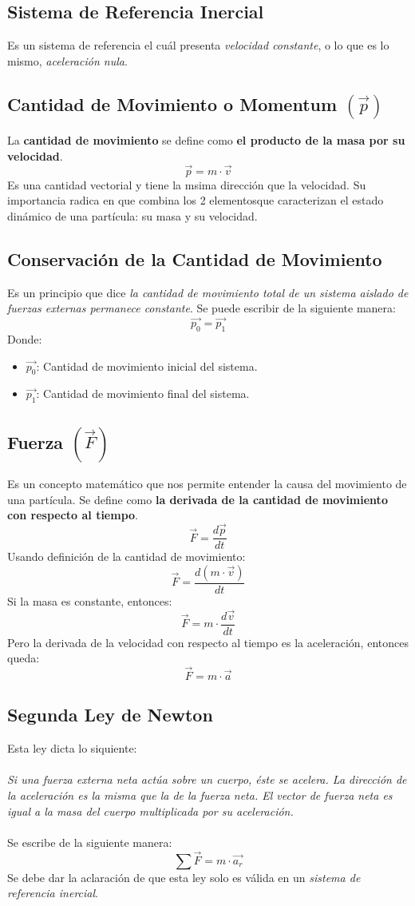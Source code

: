 \documentclass[../main.tex]{subfiles}
\begin{document}
\subsection{Sistema de Referencia Inercial}
Es un sistema de referencia el cuál presenta \textit{velocidad constante}, o lo que es lo mismo, \textit{aceleración nula}.
\subsection{Cantidad de Movimiento o Momentum \( ( \vec{p} ) \)}
La \textbf{cantidad de movimiento} se define como \textbf{el producto de la masa por su velocidad}.\cite{finn}
\[ \vec{p} = m \cdot \vec{v} \]
Es una cantidad vectorial y tiene la msima dirección que la velocidad. Su importancia radica en que combina los 2 elementosque caracterizan el estado dinámico de una partícula: su masa y su velocidad.\cite{finn}
\subsection{Conservación de la Cantidad de Movimiento}
Es un principio que dice \textit{la cantidad de movimiento total de un sistema aislado de fuerzas externas permanece constante}.
Se puede escribir de la siguiente manera:\cite{finn}
\[ \vec{p_{0}} = \vec{p_{1}} \]
Donde:
\begin{itemize}
    \item \(\vec{p_{0}}\): Cantidad de movimiento inicial del sistema.
    \item \(\vec{p_{1}}\): Cantidad de movimiento final del sistema.
\end{itemize}
\subsection{Fuerza  \( ( \vec{F} ) \)}
Es un concepto matemático que nos permite entender la causa del movimiento de una partícula. Se define como \textbf{la derivada de la cantidad de movimiento con respecto al tiempo}.\cite{finn}
\[ \vec{F} = \frac{d \vec{p}}{dt} \]
Usando definición de la cantidad de movimiento:
\[ \vec{F} = \frac{d  (m \cdot \vec{v}) }{dt} \]
Si la masa es constante, entonces:
\[ \vec{F} = m \cdot \frac{d \vec{v} }{dt} \]
Pero la derivada de la velocidad con respecto al tiempo es la aceleración, entonces queda:
\[ \vec{F}  = m \cdot \vec{a} \]

\subsection{Segunda Ley de Newton}
Esta ley dicta lo siquiente: \\ \\
\textit{Si una fuerza externa neta actúa sobre un cuerpo, éste se acelera. La dirección de la aceleración es la misma 
que la de la fuerza neta. El vector de fuerza neta es igual a la masa del cuerpo 
multiplicada por su aceleración.} \cite{sears} \\ \\
Se escribe de la siguiente manera:
\[ \sum \vec{F}  = m \cdot \vec{a_r} \]
Se debe dar la aclaración de que esta ley solo es válida en un \textit{sistema de referencia inercial}.
\end{document}
